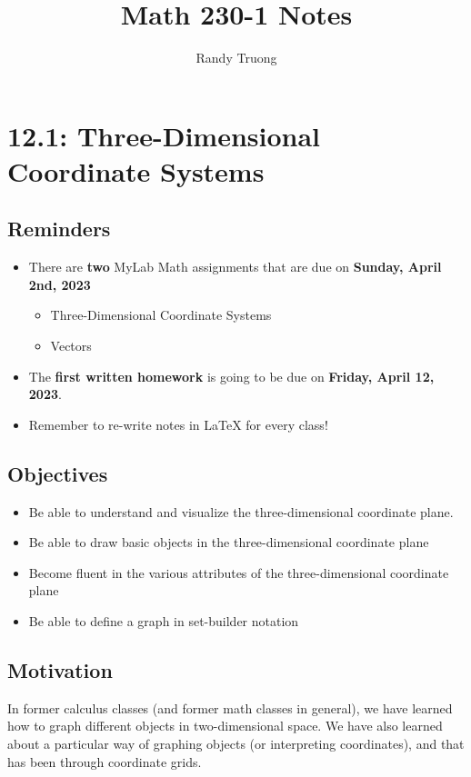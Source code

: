\documentclass{report}
\title{Math 230-1 Notes}
\author{Randy Truong}
\begin{document}
\maketitle
\begin{sloppypar}
\tableofcontents
\chapter{12.1: Three-Dimensional Coordinate Systems}
\section{Reminders}
\begin{itemize}
  \item There are \textbf{two} MyLab Math
        assignments that are due on
        \textbf{Sunday, April 2nd, 2023}
        \begin{itemize}
          \item Three-Dimensional
                Coordinate Systems
          \item Vectors

        \end{itemize}


  \item The \textbf{first
        written homework} is
        going to be due on \textbf{Friday,
        April 12, 2023}.

  \item Remember to re-write notes in LaTeX
        for every class!
\end{itemize}

\section{Objectives}
\begin{itemize}
  \item Be able to understand and visualize
        the three-dimensional coordinate
        plane.
  \item Be able to draw basic
        objects in the three-dimensional
        coordinate plane
  \item Become fluent in the various
        attributes of the three-dimensional
        coordinate plane
  \item Be able to define a graph
        in set-builder notation
\end{itemize}

\section{Motivation}
In former calculus classes (and former math
classes in general), we have learned how to
graph different objects in two-dimensional
space. We have also learned about a particular
way of graphing objects (or interpreting
coordinates), and that has been through
coordinate grids.


\end{sloppypar}
\end{document}
